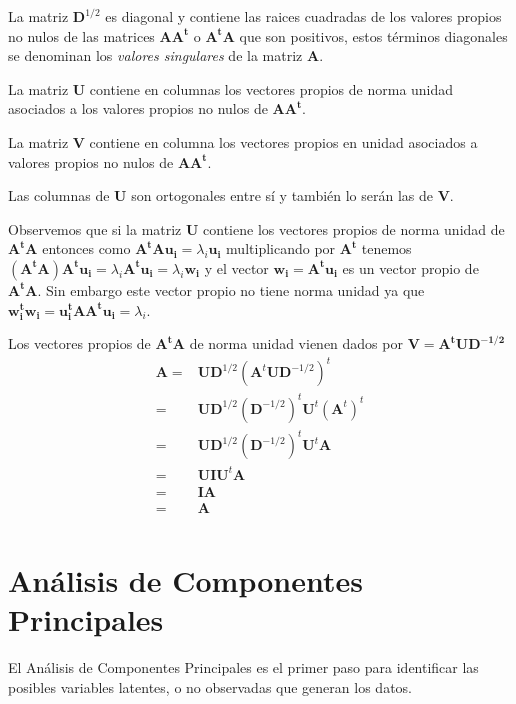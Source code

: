 \documentclass[12pt,letterpaper]{report} %
\begin{document}
La matriz $\mathbf{D}^{1/2}$ es diagonal y contiene las raices cuadradas de los valores propios no nulos de las matrices $\mathbf{AA^t}$ o $\mathbf{A^tA}$ que son positivos, estos términos diagonales se denominan los \textit{valores singulares} de la matriz $\mathbf{A}$.

La matriz $\mathbf{U}$ contiene en columnas los vectores propios de norma unidad asociados a los valores propios no nulos de $\mathbf{AA^t}$.

La matriz $\mathbf{V}$ contiene en columna los vectores propios en unidad asociados a valores propios no nulos de $\mathbf{AA^t}$.

Las columnas de $\mathbf{U}$ son ortogonales entre sí y también lo serán las de $\mathbf{V}$.

Observemos que si la matriz $\mathbf{U}$ contiene los vectores propios de norma unidad de $\mathbf{A^tA}$  entonces como $\mathbf{A^tAu_{i}}=\lambda_{i}\mathbf{u_{i}}$ multiplicando por $\mathbf{A^t}$ tenemos $\mathbf{(A^tA)A^tu_{i}}=\lambda_{i}\mathbf{A^tu_{i}}=\lambda_{i}\mathbf{w_{i}}$ y el vector $\mathbf{w_{i}}=\mathbf{A^tu_{i}}$ es un vector propio de $\mathbf{A^tA}$. Sin embargo este vector propio no tiene norma unidad ya que $\mathbf{w_{i}^t w_{i}}=\mathbf{u_{i}^tAA^tu_{i}}=\lambda_{i}$.

Los vectores propios de $\mathbf{A^tA}$ de norma unidad vienen dados por $\mathbf{V}=\mathbf{A^t U D^{-1/2}}$
$$ 
\begin{array}{rl}
\mathbf{A}= & \mathbf{U}\mathbf{D}^{1/2}(\mathbf{A}^t \mathbf{U} \mathbf{D}^{-1/2})^t\\
= & \mathbf{UD}^{1/2}(\mathbf{D}^{-1/2})^t\mathbf{U}^t(\mathbf{A}^t)^t\\
= & \mathbf{UD}^{1/2}(\mathbf{D}^{-1/2})^t\mathbf{U}^t \mathbf{A}\\
= & \mathbf{UI}\mathbf{U}^t \mathbf{A}\\
= & \mathbf{I} \mathbf{A}\\
= & \mathbf{A}\\
\end{array}
$$

\section{Análisis de Componentes Principales}

El Análisis de Componentes Principales es el primer paso para identificar las posibles variables latentes, o no observadas que generan los datos. 
\end{document}
